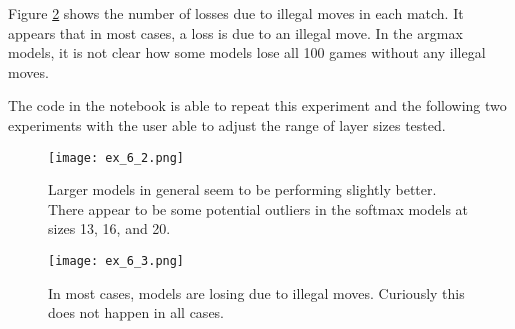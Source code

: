 \documentclass{somasmsc}
\begin{document}
\begin{exa}
 Figure \ref{ox:ex_6_3} shows the number of losses due to illegal moves in each match. It appears that in most cases, a loss is due to an illegal move. In the argmax models, it is not clear how some models lose all 100 games without any illegal moves.

The code in the notebook is able to repeat this experiment and the following two experiments with the user able to adjust the range of layer sizes tested.

\begin{figure}[H]\label{ox:ex_6_2}
\begin{center}
\texttt{[image: ex\_6\_2.png]}
\end{center}
\caption{Larger models in general seem to be performing slightly better. There appear to be some potential outliers in the softmax models at sizes 13, 16, and 20.}
\end{figure}

\begin{figure}[H]\label{ox:ex_6_3}
\begin{center}
\texttt{[image: ex\_6\_3.png]}
\end{center}
\caption{In most cases, models are losing due to illegal moves. Curiously this does not happen in all cases.}
\end{figure}
\end{exa}
\end{document}
